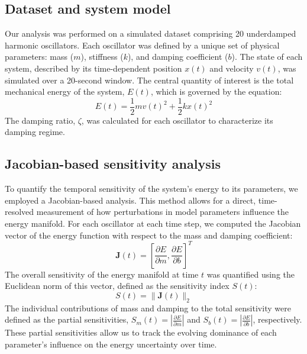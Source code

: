 \documentclass[]{article}
\begin{document}
\subsection{Dataset and system model}
Our analysis was performed on a simulated dataset comprising 20 underdamped harmonic oscillators. Each oscillator was defined by a unique set of physical parameters: mass ($m$), stiffness ($k$), and damping coefficient ($b$). The state of each system, described by its time-dependent position $x(t)$ and velocity $v(t)$, was simulated over a 20-second window. The central quantity of interest is the total mechanical energy of the system, $E(t)$, which is governed by the equation:
\begin{equation}
E(t) = \frac{1}{2} m v(t)^2 + \frac{1}{2} k x(t)^2
\label{eq:energy}
\end{equation}
The damping ratio, $\zeta$, was calculated for each oscillator to characterize its damping regime.

\subsection{Jacobian-based sensitivity analysis}
To quantify the temporal sensitivity of the system's energy to its parameters, we employed a Jacobian-based analysis. This method allows for a direct, time-resolved measurement of how perturbations in model parameters influence the energy manifold. For each oscillator at each time step, we computed the Jacobian vector of the energy function with respect to the mass and damping coefficient:
\begin{equation}
\mathbf{J}(t) = \left[ \frac{\partial E}{\partial m}, \frac{\partial E}{\partial b} \right]^T
\label{eq:jacobian}
\end{equation}
The overall sensitivity of the energy manifold at time $t$ was quantified using the Euclidean norm of this vector, defined as the sensitivity index $S(t)$:
\begin{equation}
S(t) = \| \mathbf{J}(t) \|_2
\label{eq:sensitivity_index}
\end{equation}
The individual contributions of mass and damping to the total sensitivity were defined as the partial sensitivities, $S_m(t) = |\frac{\partial E}{\partial m}|$ and $S_b(t) = |\frac{\partial E}{\partial b}|$, respectively. These partial sensitivities allow us to track the evolving dominance of each parameter's influence on the energy uncertainty over time.
\end{document}

